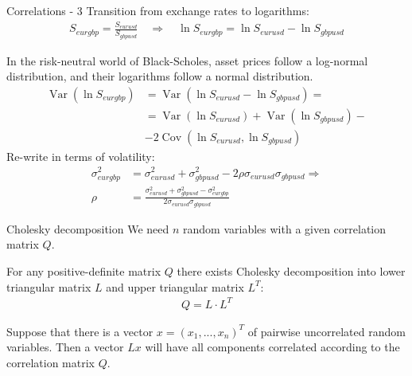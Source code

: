 \documentclass{beamer}
\begin{document}
\newcommand{\Var}{\operatorname{Var}}
\newcommand{\Cov}{\operatorname{Cov}}

\begin{frame}{Correlations - 3}
\justify
Transition from exchange rates to logarithms:
\begin{align*}
S_{eurgbp} = \frac{S_{eurusd}}{S_{gbpusd}} \quad \Rightarrow \quad \ln S_{eurgbp} = \ln S_{eurusd} - \ln S_{gbpusd} 
\end{align*}

\justify
In the risk-neutral world of Black-Scholes, asset prices follow a log-normal distribution, and their logarithms follow a normal distribution.
\begin{align*}
\Var(\ln S_{eurgbp}) &= \Var(\ln S_{eurusd} - \ln S_{gbpusd}) = \\
&= \Var(\ln S_{eurusd}) + \Var(\ln S_{gbpusd}) - \\
&- 2\Cov(\ln S_{eurusd}, \ln S_{gbpusd})
\end{align*}
Re-write in terms of volatility:
\begin{align*}
\sigma_{eurgbp}^2 &= \sigma_{eurusd}^2 + \sigma_{gbpusd}^2 - 2\rho\sigma_{eurusd}\sigma_{gbpusd} \Rightarrow \\
\rho &= \frac{\sigma_{eurusd}^2 + \sigma_{gbpusd}^2 - \sigma_{eurgbp}^2}{2\sigma_{eurusd}\sigma_{gbpusd}}
\end{align*}
\end{frame}



\begin{frame}{Cholesky decomposition}
\justify
We need $n$ random variables with a given correlation matrix $Q$.

\justify
For any positive-definite matrix $Q$ there exists Cholesky decomposition into lower triangular matrix $L$ and upper triangular matrix $L^T$:
\begin{align*}
Q = L \cdot L^T
\end{align*}

\justify
Suppose that there is a vector $x=(x_1,...,x_n)^T$ of pairwise uncorrelated random variables. Then a vector $Lx$ will have all components correlated according to the correlation matrix $Q$.
\end{frame}
\end{document}
